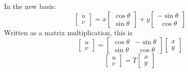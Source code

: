 \documentclass[11pt, oneside]{article}
\begin{document}
In the new basis:
\[
\begin{bmatrix} 
u \\ 
v 
\end{bmatrix}
=
x
\begin{bmatrix}  \cos \theta \\ \sin \theta \end{bmatrix}
+
y
\begin{bmatrix}  -\sin \theta \\ \ \ \cos \theta \end{bmatrix}
\]
Written as a matrix multiplication, this is
\[
\begin{bmatrix}  u \\ v\end{bmatrix}
=
\begin{bmatrix}  
\cos \theta & -\sin \theta \\
\sin \theta & \ \  \cos \theta 
\end{bmatrix}
\begin{bmatrix}  x \\ y \end{bmatrix}
\]
\[ \begin{bmatrix}  u \\ v\end{bmatrix}
=
T 
\begin{bmatrix}  x \\ y \end{bmatrix}
\]
\end{document}
